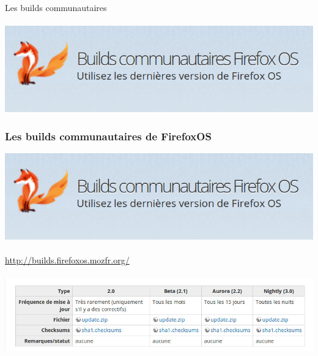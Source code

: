 \documentclass{beamer}
\begin{document}
\begin{frame}
\begin{center}
\Huge{Les builds communautaires}
\\~\\
\includegraphics[scale=0.3]{./images/builds_communautaire_logo.jpg}
\end{center}
\end{frame}
\begin{frame}
\frametitle{Les builds communautaires de FirefoxOS}
\begin{center}
\includegraphics[scale=0.3]{./images/builds_communautaire_logo.jpg}
\\~\\
\url{http://builds.firefoxos.mozfr.org/}
\\~\\
\includegraphics[scale=0.3]{./images/builds_communautaire_01.jpg}
\end{center}
\end{frame}
\end{document}
